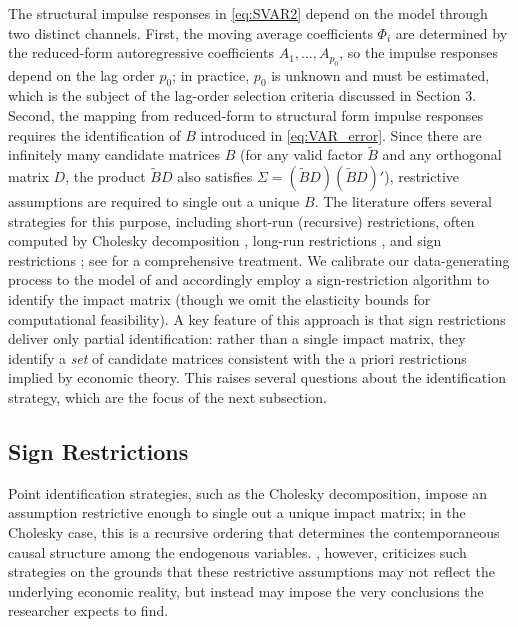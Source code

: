 \documentclass[12pt, a4paper]{article}
\begin{document}
The structural impulse responses in \eqref{eq:SVAR2} depend on the model through two distinct channels. First, the moving average coefficients $\Phi_i$ are determined by the reduced-form autoregressive coefficients $A_1,...,A_{p_0}$, so the impulse responses depend on the lag order $p_0$; in practice, $p_0$ is unknown and must be estimated, which is the subject of the lag-order selection criteria discussed in Section 3. Second, the mapping from reduced-form to structural form impulse responses requires the identification of $B$ introduced in \eqref{eq:VAR_error}. Since there are infinitely many candidate matrices $B$ (for any valid factor $\tilde{B}$ and any orthogonal matrix $D$, the product $\tilde{B} D$ also satisfies $\Sigma = (\tilde{B} D)(\tilde{B} D)'$), restrictive assumptions are required to single out a unique $B$. The literature offers several strategies for this purpose, including short-run (recursive) restrictions, often computed by Cholesky decomposition \citep{simsMacroeconomicsReality1980,christianoMonetaryPolicyShocks1999}, long-run restrictions \citep{blanchardDynamicEffectsAggregate1989}, and sign restrictions \citep{faustRobustnessIdentifiedVAR1998, canovaMonetaryDisturbancesMatter2002, uhligWhatAreEffects2005,rubio-ramirezStructuralVectorAutoregressions2010}; see \citet{kilianStructuralVectorAutoregressive2017} for a comprehensive treatment. We calibrate our data-generating process to the model of \citet{kilianRoleInventoriesSpeculative2014} and accordingly employ a sign-restriction algorithm to identify the impact matrix (though we omit the elasticity bounds for computational feasibility). A key feature of this approach is that sign restrictions deliver only partial identification: rather than a single impact matrix, they identify a \textit{set} of candidate matrices consistent with the a priori restrictions implied by economic theory. This raises several questions about the identification strategy, which are the focus of the next subsection.

\subsection{Sign Restrictions}
\label{sec:sign_restrictions}

Point identification strategies, such as the Cholesky decomposition, impose an assumption restrictive enough to single out a unique impact matrix; in the Cholesky case, this is a recursive ordering that determines the contemporaneous causal structure among the endogenous variables. \citet{uhligWhatAreEffects2005}, however, criticizes such strategies on the grounds that these restrictive assumptions may not reflect the underlying economic reality, but instead may impose the very conclusions the researcher expects to find.
\end{document}
